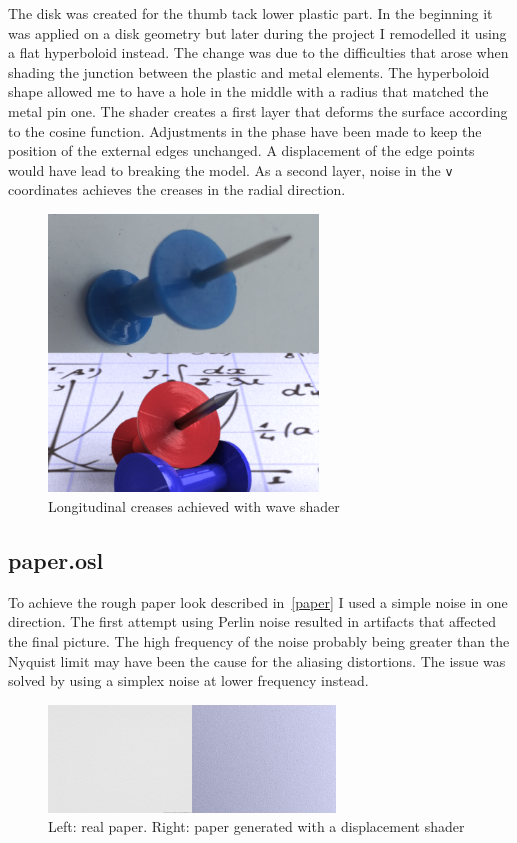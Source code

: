 \documentclass[tog]{acmsiggraph}
\begin{document}
The disk was created for the thumb tack lower plastic part. In the beginning it was applied on a disk geometry but later during the project I remodelled it using a flat hyperboloid instead. The change was due to the difficulties that arose when shading the junction between the plastic and metal elements. The hyperboloid shape allowed me to have a hole in the middle with a radius that matched the metal pin one. The shader creates a first layer that deforms the surface according to the cosine function. Adjustments in the phase have been made to keep the position of the external edges unchanged. A displacement of the edge points would have lead to breaking the model. As a second layer, noise in the \texttt{v} coordinates achieves the creases in the radial direction.

\begin{figure}[ht]
  \centering
  \includegraphics[height=2.9in]{images/disk}
  \caption{Longitudinal creases achieved with wave shader}
  \label{fig:disk}
\end{figure}

\subsection{paper.osl}

To achieve the rough paper look described in~\ref{paper} I used a simple noise in one direction. The first attempt using Perlin noise resulted in artifacts that affected the final picture. The high frequency of the noise probably being greater than the Nyquist limit may have been the cause for the aliasing distortions. The issue was solved by using a simplex noise at lower frequency instead.

\begin{figure}[ht]
  \centering
  \includegraphics[width=3.0in]{images/paper.png}
  \caption{Left: real paper. Right: paper generated with a displacement shader}
  \label{fig:paper}
\end{figure}
\end{document}
